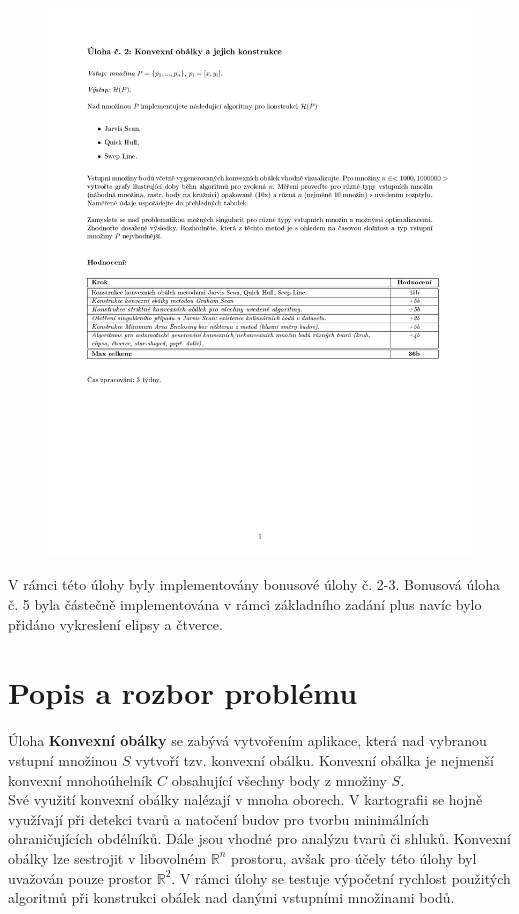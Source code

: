 \documentclass[a4paper, 12pt]{article}
\begin{document}
\begin{figure}[h!]
	\includegraphics[clip, trim=0cm 10cm 0cm 3cm, width=1.0\textwidth]{./pictures/zadani02.pdf}
\end{figure}

V rámci této úlohy byly implementovány bonusové úlohy č. 2-3. Bonusová úloha č. 5 byla částečně implementována v rámci základního zadání plus navíc bylo přidáno vykreslení elipsy a čtverce.
\clearpage

\section{Popis a rozbor problému}
Úloha \textbf{Konvexní obálky} se zabývá vytvořením aplikace, která nad vybranou vstupní množinou $S$ vytvoří tzv. konvexní obálku. Konvexní obálka je nejmenší konvexní mnoho\-úhelník $C$ obsahující všechny body z množiny $S$.\\ 

Své využití konvexní obálky nalézají v mnoha oborech. V kartografii se hojně využívají při detekci tvarů a natočení budov pro tvorbu minimálních ohraničujících obdélníků. Dále jsou vhodné pro analýzu tvarů či shluků. Konvexní obálky lze sestrojit v libovolném $\mathbb{R}^n$ prostoru, avšak pro účely této úlohy byl uvažován pouze prostor $\mathbb{R}^2$. V rámci úlohy se testuje výpočetní rychlost použitých algoritmů při konstrukci obálek nad danými vstupními množinami bodů.
\end{document}
